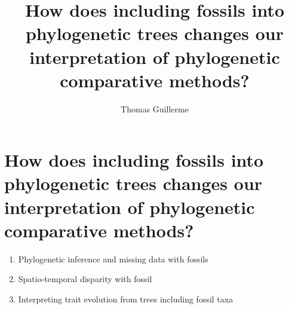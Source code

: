 \documentclass[twoside,12pt]{header/thesistemplate} %
\title{How does including fossils into phylogenetic trees changes our interpretation of phylogenetic comparative methods?}
\author{Thomas Guillerme}
\begin{document}
\maketitle %




\allcontents %

\cleardoublepage

\mainbody

\section{How does including fossils into phylogenetic trees changes our interpretation of phylogenetic comparative methods?}
\begin{enumerate}
\item{Phylogenetic inference and missing data with fossils}
\item{Spatio-temporal disparity with fossil}
\item{Interpreting trait evolution from trees including fossil taxa}
\end{enumerate}



	

\formatbibliography 




\formatappendices

\end{document}
